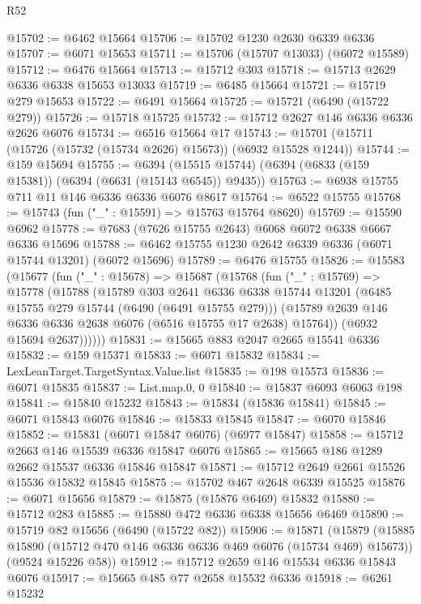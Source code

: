 \begin{lexlean}{R52}
\begin{coremodule}
@15702 := @6462 @15664
@15706 := @15702 @1230 @2630 @6339 @6336
@15707 := @6071 @15653
@15711 := @15706 (@15707 @13033) (@6072 @15589)
@15712 := @6476 @15664
@15713 := @15712 @303
@15718 := @15713 @2629 @6336 @6338 @15653 @13033
@15719 := @6485 @15664
@15721 := @15719 @279 @15653
@15722 := @6491 @15664
@15725 := @15721 (@6490 (@15722 @279))
@15726 := @15718 @15725
@15732 := @15712 @2627 @146 @6336 @6336 @2626 @6076
@15734 := @6516 @15664 @17
@15743 := @15701 (@15711 (@15726 (@15732 (@15734 @2626) @15673)) (@6932 @15528 @1244))
@15744 := @159 @15694
@15755 := @6394 (@15515 @15744) (@6394 (@6833 (@159 @15381)) (@6394 (@6631 (@15143 @6545)) @9435))
@15763 := @6938 @15755 @711 @11 @146 @6336 @6336 @6076 @8617
@15764 := @6522 @15755
@15768 := @15743 (fun ("_" : @15591) => @15763 @15764 @8620)
@15769 := @15590 @6962
@15778 := @7683 (@7626 @15755 @2643) @6068 @6072 @6338 @6667 @6336 @15696
@15788 := @6462 @15755 @1230 @2642 @6339 @6336 (@6071 @15744 @13201) (@6072 @15696)
@15789 := @6476 @15755
@15826 := @15583
    (@15677
      (fun ("_" : @15678) =>
      @15687
        (@15768
          (fun ("_" : @15769) =>
          @15778
            (@15788
              (@15789
                @303
                @2641
                @6336
                @6338
                @15744
                @13201
                (@6485 @15755 @279 @15744 (@6490 (@6491 @15755 @279)))
                (@15789 @2639 @146 @6336 @6336 @2638 @6076 (@6516 @15755 @17 @2638) @15764))
              (@6932 @15694 @2637))))))
@15831 := @15665 @883 @2047 @2665 @15541 @6336
@15832 := @159 @15371
@15833 := @6071 @15832
@15834 := LexLeanTarget.TargetSyntax.Value.list
@15835 := @198 @15573
@15836 := @6071 @15835
@15837 := List.map.{0, 0}
@15840 := @15837 @6093 @6063 @198
@15841 := @15840 @15232
@15843 := @15834 (@15836 @15841)
@15845 := @6071 @15843 @6076
@15846 := @15833 @15845
@15847 := @6070 @15846
@15852 := @15831 (@6071 @15847 @6076) (@6977 @15847)
@15858 := @15712 @2663 @146 @15539 @6336 @15847 @6076
@15865 := @15665 @186 @1289 @2662 @15537 @6336 @15846 @15847
@15871 := @15712 @2649 @2661 @15526 @15536 @15832 @15845
@15875 := @15702 @467 @2648 @6339 @15525
@15876 := @6071 @15656
@15879 := @15875 (@15876 @6469) @15832
@15880 := @15712 @283
@15885 := @15880 @472 @6336 @6338 @15656 @6469
@15890 := @15719 @82 @15656 (@6490 (@15722 @82))
@15906 := @15871
    (@15879
      (@15885 @15890 (@15712 @470 @146 @6336 @6336 @469 @6076 (@15734 @469) @15673))
      (@9524 @15226 @58))
@15912 := @15712 @2659 @146 @15534 @6336 @15843 @6076
@15917 := @15665 @485 @77 @2658 @15532 @6336
@15918 := @6261 @15232

\end{coremodule}
\end{lexlean}
